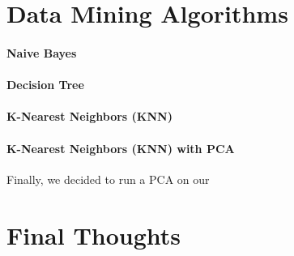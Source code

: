 \documentclass[12pt]{report}
\begin{document}
%

\section{Data Mining Algorithms}

\paragraph{Naive Bayes} 


\paragraph{Decision Tree}



\paragraph{K-Nearest Neighbors (KNN)}


\paragraph{K-Nearest Neighbors (KNN) with PCA} Finally, we decided to run a PCA on our 

\section{Final Thoughts} 
\end{document}
